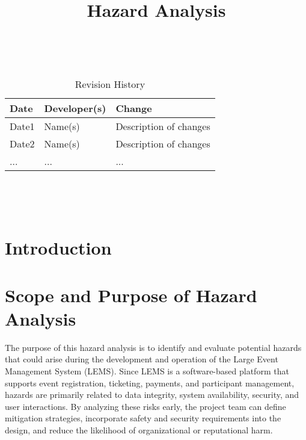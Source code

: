 \documentclass{article}
\title{Hazard Analysis\\\progname}
\author{\authname}
\date{}
\begin{document}
\maketitle
\thispagestyle{empty}

~\newpage


\begin{table}[hp]
\caption{Revision History} \label{TblRevisionHistory}
\begin{tabularx}{\textwidth}{llX}
\toprule
\textbf{Date} & \textbf{Developer(s)} & \textbf{Change}\\
\midrule
Date1 & Name(s) & Description of changes\\
Date2 & Name(s) & Description of changes\\
... & ... & ...\\
\bottomrule
\end{tabularx}
\end{table}

~\newpage

\tableofcontents

~\newpage



\section{Introduction}


\section{Scope and Purpose of Hazard Analysis}


The purpose of this hazard analysis is to identify and evaluate potential hazards that could arise during 
the development and operation of the Large Event Management System (LEMS). Since LEMS is a 
software-based platform that supports event registration, ticketing, payments, and participant 
management, hazards are primarily related to data integrity, system availability, security, and user 
interactions. By analyzing these risks early, the project team can define mitigation strategies, 
incorporate safety and security requirements into the design, and reduce the likelihood of 
organizational or reputational harm.

\par
\vspace{1em}
\end{document}
